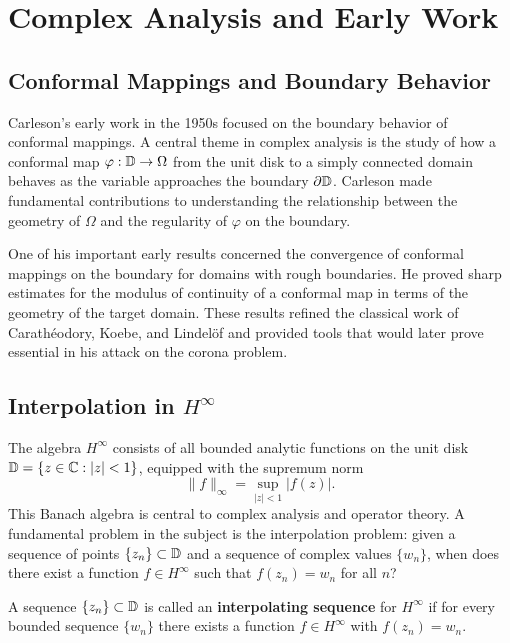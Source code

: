 \section{Complex Analysis and Early Work}

\subsection{Conformal Mappings and Boundary Behavior}

Carleson's early work in the 1950s focused on the boundary behavior of conformal mappings. A central theme in complex analysis is the study of how a conformal map \(\varphi: \mathbb{D} \to \Omega\) from the unit disk to a simply connected domain behaves as the variable approaches the boundary \(\partial \mathbb{D}\). Carleson made fundamental contributions to understanding the relationship between the geometry of \(\Omega\) and the regularity of \(\varphi\) on the boundary.

One of his important early results concerned the convergence of conformal mappings on the boundary for domains with rough boundaries. He proved sharp estimates for the modulus of continuity of a conformal map in terms of the geometry of the target domain. These results refined the classical work of Carath\'eodory, Koebe, and Lindel\"of and provided tools that would later prove essential in his attack on the corona problem.

\subsection{Interpolation in \texorpdfstring{\(H^\infty\)}{H-infinity}}

The algebra \(H^\infty\) consists of all bounded analytic functions on the unit disk \(\mathbb{D} = \{z \in \mathbb{C} : |z| < 1\}\), equipped with the supremum norm
\[
\|f\|_\infty = \sup_{|z| < 1} |f(z)|.
\]
This Banach algebra is central to complex analysis and operator theory. A fundamental problem in the subject is the interpolation problem: given a sequence of points \(\{z_n\} \subset \mathbb{D}\) and a sequence of complex values \(\{w_n\}\), when does there exist a function \(f \in H^\infty\) such that \(f(z_n) = w_n\) for all \(n\)?

\begin{definition}
A sequence \(\{z_n\} \subset \mathbb{D}\) is called an \textbf{interpolating sequence} for \(H^\infty\) if for every bounded sequence \(\{w_n\}\) there exists a function \(f \in H^\infty\) with \(f(z_n) = w_n\).
\end{definition}

